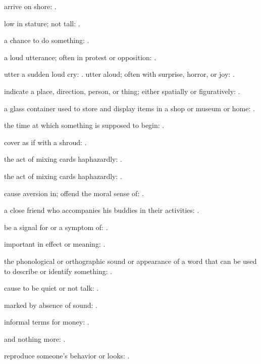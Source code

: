   arrive on shore: .

  low in stature; not tall: .

  a chance to do something: .

  a loud utterance; often in protest or opposition: .

  utter a sudden loud cry: . utter aloud; often with surprise, horror, or joy: .

  indicate a place, direction, person, or thing; either spatially or figuratively: .

  a glass container used to store and display items in a shop or museum or home: .

  the time at which something is supposed to begin: .

  cover as if with a shroud: .

  the act of mixing cards haphazardly: .

  the act of mixing cards haphazardly: .

  cause aversion in; offend the moral sense of: .

  a close friend who accompanies his buddies in their activities: .

  be a signal for or a symptom of: .

  important in effect or meaning: .

  the phonological or orthographic sound or appearance of a word that can be used to describe or identify something: .

  cause to be quiet or not talk: .

  marked by absence of sound: .

  informal terms for money: .

  and nothing more: .

  reproduce someone's behavior or looks: .

